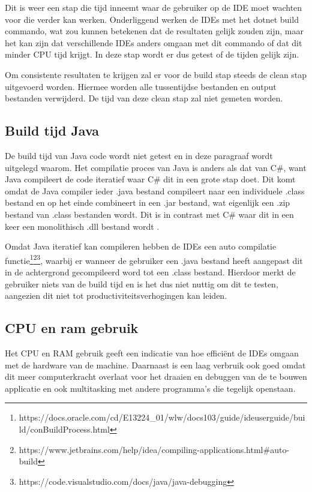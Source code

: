 Dit is weer een stap die tijd inneemt waar de gebruiker op de IDE moet wachten voor die verder kan werken. Onderliggend werken de IDEs met het dotnet build commando, wat zou kunnen betekenen dat de resultaten gelijk zouden zijn, maar het kan zijn dat verschillende IDEs anders omgaan met dit commando of dat dit minder CPU tijd krijgt. In deze stap wordt er dus getest of de tijden gelijk zijn.

Om consistente resultaten te krijgen zal er voor de build stap steeds de clean stap uitgevoerd worden. Hiermee worden alle tussentijdse bestanden en output bestanden verwijderd. De tijd van deze clean stap zal niet gemeten worden.

\subsection{Build tijd Java}
De build tijd van Java code wordt niet getest en in deze paragraaf wordt uitgelegd waarom. Het compilatie proces van Java is anders als dat van C\#, want Java compileert de code iteratief waar C\# dit in een grote stap doet. Dit komt omdat de Java compiler ieder .java bestand compileert naar een individuele .class bestand en op het einde combineert in een .jar bestand, wat eigenlijk een .zip bestand van .class bestanden wordt. Dit is in contrast met C\# waar dit in een keer een monolithisch .dll bestand wordt \autocite{Parveen2016}.

Omdat Java iteratief kan compileren hebben de IDEs een auto compilatie functie\footnote{https://docs.oracle.com/cd/E13224\_01/wlw/docs103/guide/ideuserguide/build/conBuildProcess.html}\footnote{https://www.jetbrains.com/help/idea/compiling-applications.html\#auto-build}\footnote{https://code.visualstudio.com/docs/java/java-debugging}, waarbij er wanneer de gebruiker een .java bestand heeft aangepast dit in de achtergrond gecompileerd word tot een .class bestand. Hierdoor merkt de gebruiker niets van de build tijd en is het dus niet nuttig om dit te testen, aangezien dit niet tot productiviteitsverhogingen kan leiden.

\subsection{CPU en ram gebruik}
Het CPU en RAM gebruik geeft een indicatie van hoe efficiënt de IDEs omgaan met de hardware van de machine. Daarnaast is een laag verbruik ook goed omdat dit meer computerkracht overlaat voor het draaien en debuggen van de te bouwen applicatie en ook multitasking met andere programma's die tegelijk openstaan.

